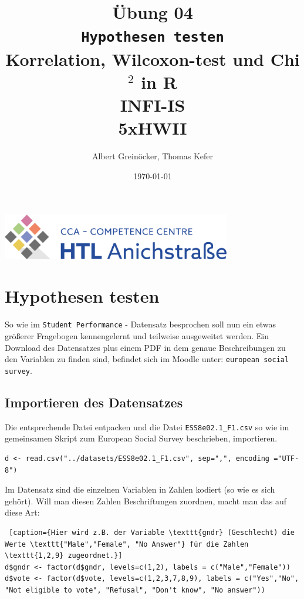 \documentclass{article}
\title{Übung 04 \\ \texttt{Hypothesen testen} \\ Korrelation, Wilcoxon-test und Chi$^{2}$ in \textbf{R} \\ INFI-IS \\ 5xHWII} %
\author{Albert Greinöcker, Thomas Kefer}
\date{\today} %
\begin{document}
	
	\maketitle %
	
	\begin{center}
		
		\includegraphics[width=10cm]{../images/logo.png}
	\end{center}
	\vspace{1cm}

\section{Hypothesen testen}


So wie im \texttt{Student Performance} - Datensatz besprochen soll nun ein etwas größerer Fragebogen kennengelernt und teilweise ausgeweitet werden. Ein Download des Datensatzes plus einem PDF in dem genaue Beschreibungen zu den Variablen zu finden sind, befindet sich im Moodle unter: \texttt{european social survey}.


\subsection{Importieren des Datensatzes}

Die entsprechende Datei entpacken und die Datei \texttt{ESS8e02.1\_F1.csv}  so wie im gemeinsamen Skript zum European Social Survey beschrieben, importieren.

 \begin{lstlisting} 
d <- read.csv("../datasets/ESS8e02.1_F1.csv", sep=",", encoding ="UTF-8")
 \end{lstlisting}

Im Datensatz sind die einzelnen Variablen in Zahlen kodiert (so wie es sich gehört). Will man diesen Zahlen Beschriftungen zuordnen, macht man das auf diese Art:

 \begin{lstlisting} [caption={Hier wird z.B. der Variable \texttt{gndr} (Geschlecht) die Werte \texttt{"Male","Female", "No Answer"} für die Zahlen \texttt{1,2,9} zugeordnet.}]
d$gndr <- factor(d$gndr, levels=c(1,2), labels = c("Male","Female"))
d$vote <- factor(d$vote, levels=c(1,2,3,7,8,9), labels = c("Yes","No", "Not eligible to vote", "Refusal", "Don't know", "No answer"))
 \end{lstlisting}
\end{document}

